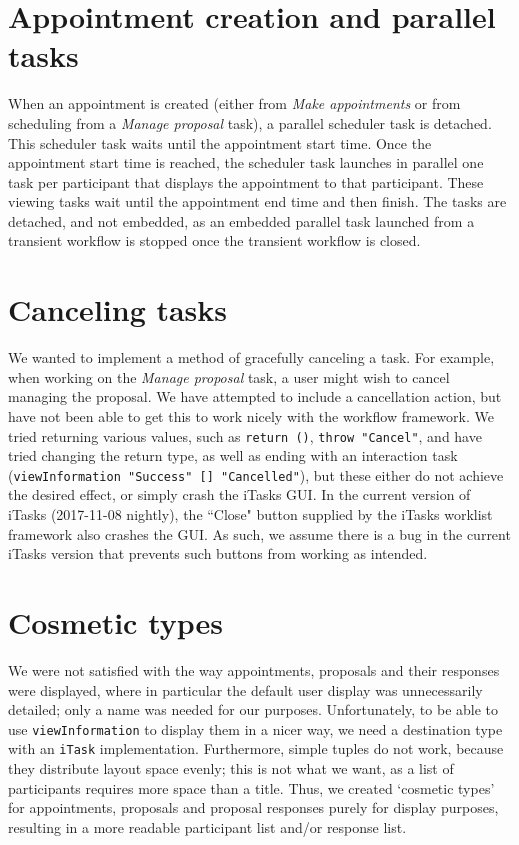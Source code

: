 \documentclass{article}
\begin{document}
    \section{Appointment creation and parallel tasks}
	When an appointment is created (either from \emph{Make appointments} or from scheduling from a \emph{Manage proposal} task), a parallel scheduler task is detached.
	This scheduler task waits until the appointment start time.
	Once the appointment start time is reached, the scheduler task launches in parallel one task per participant that displays the appointment to that participant.
	These viewing tasks wait until the appointment end time and then finish.
	The tasks are detached, and not embedded, as an embedded parallel task launched from a transient workflow is stopped once the transient workflow is closed.
    
    \section{Canceling tasks}
	We wanted to implement a method of gracefully canceling a task.
	For example, when working on the \emph{Manage proposal} task, a user might wish to cancel managing the proposal.
	We have attempted to include a cancellation action, but have not been able to get this to work nicely with the workflow framework.
	We tried returning various values, such as \lstinline|return ()|, \lstinline|throw "Cancel"|, and have tried changing the return type, as well as ending with an interaction task (\lstinline|viewInformation "Success" [] "Cancelled"|), but these either do not achieve the desired effect, or simply crash the iTasks GUI.
	In the current version of iTasks (2017-11-08 nightly), the ``Close" button supplied by the iTasks worklist framework also crashes the GUI.
	As such, we assume there is a bug in the current iTasks version that prevents such buttons from working as intended.
    
    \section{Cosmetic types}
	We were not satisfied with the way appointments, proposals and their responses were displayed, where in particular the default user display was unnecessarily detailed; only a name was needed for our purposes.
    Unfortunately, to be able to use \lstinline|viewInformation| to display them in a nicer way, we need a destination type with an \lstinline|iTask| implementation.
    Furthermore, simple tuples do not work, because they distribute layout space evenly; this is not what we want, as a list of participants requires more space than a title.
    Thus, we created `cosmetic types' for appointments, proposals and proposal responses purely for display purposes, resulting in a more readable participant list and/or response list.
	
\end{document}
